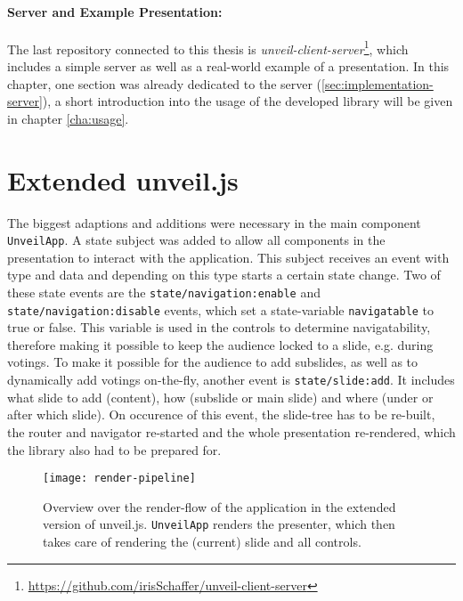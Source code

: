 \paragraph{Server and Example Presentation:} The last repository connected to this thesis is \emph{unveil-client-server}\footnote{\url{https://github.com/irisSchaffer/unveil-client-server}}, which includes a simple server as well as a real-world example of a presentation. In this chapter, one section was already dedicated to the server (\ref{sec:implementation-server}), a short introduction into the usage of the developed library will be given in chapter \ref{cha:usage}.

\section{Extended unveil.js}
\label{sec:implementation-unveil}
The biggest adaptions and additions were necessary in the main component \texttt{UnveilApp}. A state subject was added to allow all components in the presentation to interact with the application. This subject receives an event with type and data and depending on this type starts a certain state change. Two of these state events are the \texttt{state/navigation:enable} and \texttt{state/navigation:disable} events, which set a state-variable \texttt{navigatable} to true or false. This variable is used in the controls to determine navigatability, therefore making it possible to keep the audience locked to a slide, e.g. during votings.
To make it possible for the audience to add subslides, as well as to dynamically add votings on-the-fly, another event is \texttt{state/slide:add}. It includes what slide to add (content), how (subslide or main slide) and where (under or after which slide). On occurence of this event, the slide-tree has to be re-built, the router and navigator re-started and the whole presentation re-rendered, which the library also had to be prepared for.

\begin{figure}
\centering
\texttt{[image: render-pipeline]}
\caption{Overview over the render-flow of the application in the extended version of unveil.js. \texttt{UnveilApp} renders the presenter, which then takes care of rendering the (current) slide and all controls.}
\label{fig:implementation-unveil-render-pipeline}
\end{figure}

